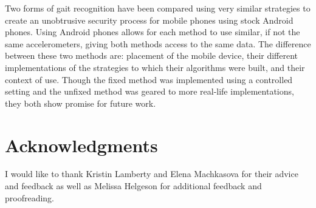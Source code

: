 \documentclass{sig-alternate}
\begin{document}
	Two forms of gait recognition have been compared using very similar strategies to create an unobtrusive security process for mobile phones using stock Android phones. Using Android phones allows for each method to use similar, if not the same accelerometers, giving both methods access to the same data. The difference between these two methods are: placement of the mobile device, their different implementations of the strategies to which their algorithms were built, and their context of use. Though the fixed method was implemented using a controlled setting and the unfixed method was geared to more real-life implementations, they both show promise for future work. 
\section{Acknowledgments}
	I would like to thank Kristin Lamberty and Elena Mach\-kasova for their advice and feedback as well as Melissa Helgeson for additional feedback and proofreading. 




  


%
%
\end{document}
